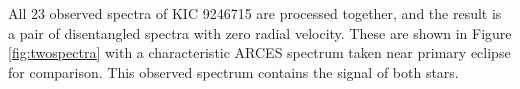 All 23 observed spectra of KIC 9246715 are processed together, and the result is a pair of disentangled spectra with zero radial velocity. These are shown in Figure \ref{fig:twospectra} with a characteristic ARCES spectrum taken near primary eclipse for comparison. This observed spectrum contains the signal of both stars.
